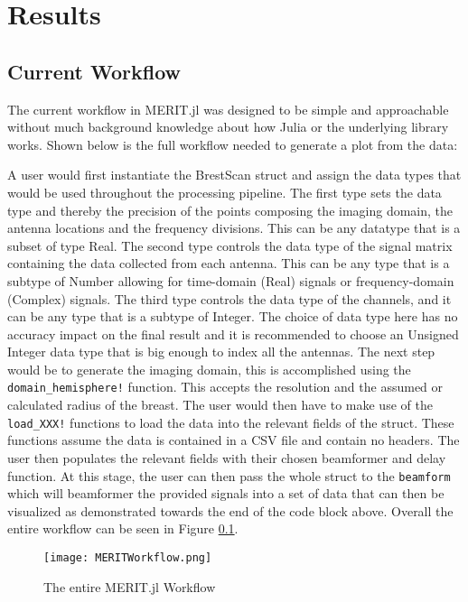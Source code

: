 \setcounter{chapter}{4}
\setcounter{section}{0}
\setcounter{subsection}{0}
\chapter*{Results}
\section{Current Workflow}
The current workflow in MERIT.jl was designed to be simple and approachable without much background knowledge about how
Julia or the underlying library works. Shown below is the full workflow needed to generate a plot from the data:

A user would first instantiate the BrestScan struct and assign the data types that would be used throughout the
processing pipeline. The first type sets the data type and thereby the precision of the points composing the imaging
domain, the antenna locations and the frequency divisions. This can be any datatype that is a subset of type Real. The
second type controls the data type of the signal matrix containing the data collected from each antenna. This can be any
type that is a subtype of Number allowing for time-domain (Real) signals or frequency-domain (Complex) signals. The
third type controls the data type of the channels, and it can be any type that is a subtype of Integer. The choice of
data type here has no accuracy impact on the final result and it is recommended to choose an Unsigned Integer data type
that is big enough to index all the antennas. The next step would be to generate the imaging domain, this is
accomplished using the \lstinline[language=Julia]{domain_hemisphere!} function. This accepts the resolution and the
assumed or calculated radius of the breast. The user would then have to make use of the
\lstinline[language=Julia]{load_XXX!} functions to load the data into the relevant fields of the struct. These functions
assume the data is contained in a CSV file and contain no headers. The user then populates the relevant fields with
their chosen beamformer and delay function. At this stage, the user can then pass the whole struct to the
\lstinline[language=Julia]{beamform} which will beamformer the provided signals into a set of data that can then be
visualized as demonstrated towards the end of the code block above. Overall the entire workflow can be seen in Figure
\ref{fig:MERITWorkflow}.

\begin{figure}[h!]
    \texttt{[image: MERITWorkflow.png]}
    \centering
    \caption{The entire MERIT.jl Workflow} 
    \label{fig:MERITWorkflow}
\end{figure}

